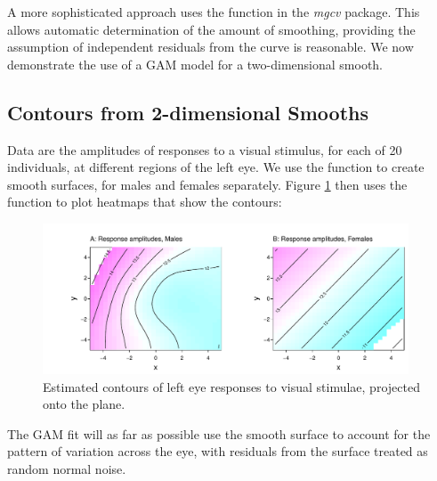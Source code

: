 A more sophisticated approach uses the  function
in the {\em mgcv} package.  This allows automatic determination of the
amount of smoothing, providing the assumption of independent residuals
from the curve is reasonable.  We now demonstrate the use of a GAM
model for a two-dimensional smooth.

\subsection{Contours from 2-dimensional Smooths}
Data are the amplitudes of responses to a visual stimulus, for each of
20 individuals, at different regions of the left eye.  We use the
function  to create smooth
surfaces, for males and females separately. Figure \ref{fig:visAmp}
then uses the function  to plot heatmaps that show the
contours:
\begin{fullwidth}
\begin{figure}
\begin{Schunk}


\centerline{\includegraphics[width=0.97\textwidth]{figs/8-plotVIS-1} }

\end{Schunk}
\vspace*{-7pt}
\caption{Estimated contours of left eye responses to visual stimulae,
projected onto the plane.\label{fig:visAmp}}
\vspace*{15pt}
\end{figure}
\end{fullwidth}
\enlargethispage{12pt}

The GAM fit will as far as possible use the smooth surface
to account for the pattern of variation across the eye, with
residuals from the surface treated as random normal noise.
\vspace*{7pt}

